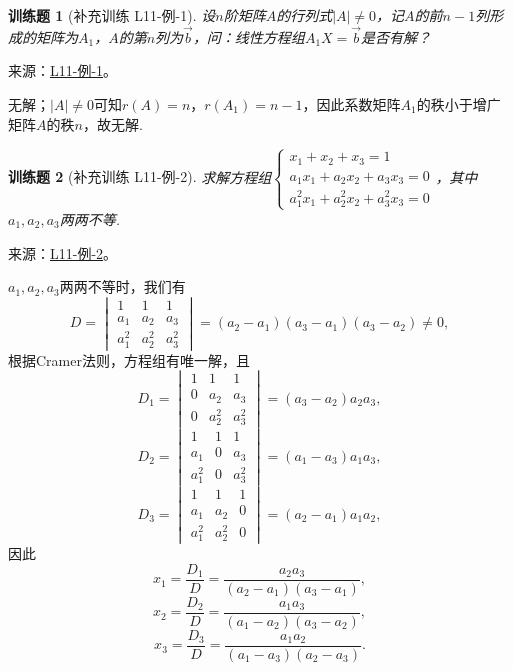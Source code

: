 \documentclass[UTF8,12pt,a4paper,fontset=fandol]{ctexart}
\newtheorem{exercise}{训练题}[section]
\begin{document}
\begin{exercise}[补充训练 L11-例-1]\label{prob:L11-例-1}
设$n$阶矩阵$A$的行列式$|A|\neq 0$，记$A$的前$n-1$列形成的矩阵为$A_1$，$A$的第$n$列为$\vec{b}$，问：线性方程组$A_1X=\vec{b}$是否有解？
\end{exercise}
\noindent 来源：\href{https://github.com/yhwu-is/Linear-Algebra-Left-Undone/blob/new/%E8%AE%B2%E4%B9%89/%E4%B8%93%E9%A2%98/11%20%E6%9C%9D%E8%8A%B1%E5%A4%95%E6%8B%BE.tex}{L11-例-1}。
\begin{solve}
无解；$|A|\neq 0$可知$r(A)=n$，$r(A_1)=n-1$，因此系数矩阵$A_1$的秩小于增广矩阵$A$的秩$n$，故无解.
\end{solve}

\begin{exercise}[补充训练 L11-例-2]\label{prob:L11-例-2}
求解方程组$\begin{cases}
            x_1+x_2+x_3=1          \\
            a_1x_1+a_2x_2+a_3x_3=0 \\
            a_1^2x_1+a_2^2x_2+a_3^2x_3=0
        \end{cases}$，其中$a_1,a_2,a_3$两两不等.
\end{exercise}
\noindent 来源：\href{https://github.com/yhwu-is/Linear-Algebra-Left-Undone/blob/new/%E8%AE%B2%E4%B9%89/%E4%B8%93%E9%A2%98/11%20%E6%9C%9D%E8%8A%B1%E5%A4%95%E6%8B%BE.tex}{L11-例-2}。
\begin{solve}
$a_1,a_2,a_3$两两不等时，我们有
    \[D=\begin{vmatrix}
            1     & 1     & 1     \\
            a_1   & a_2   & a_3   \\
            a_1^2 & a_2^2 & a_3^2
        \end{vmatrix}=(a_2-a_1)(a_3-a_1)(a_3-a_2)\neq 0,\]
    根据Cramer法则，方程组有唯一解，且
    \[D_1=\begin{vmatrix}
            1 & 1     & 1     \\
            0 & a_2   & a_3   \\
            0 & a_2^2 & a_3^2
        \end{vmatrix}=(a_3-a_2)a_2a_3,\]
    \[D_2=\begin{vmatrix}
            1     & 1 & 1     \\
            a_1   & 0 & a_3   \\
            a_1^2 & 0 & a_3^2
        \end{vmatrix}=(a_1-a_3)a_1a_3,\]
    \[D_3=\begin{vmatrix}
            1     & 1     & 1 \\
            a_1   & a_2   & 0 \\
            a_1^2 & a_2^2 & 0
        \end{vmatrix}=(a_2-a_1)a_1a_2,\]
    因此
    \[x_1=\dfrac{D_1}{D}=\dfrac{a_2a_3}{(a_2-a_1)(a_3-a_1)},\]\[x_2=\dfrac{D_2}{D}=\dfrac{a_1a_3}{(a_1-a_2)(a_3-a_2)},\]\[x_3=\dfrac{D_3}{D}=\dfrac{a_1a_2}{(a_1-a_3)(a_2-a_3)}.\]
\end{solve}
\end{document}
